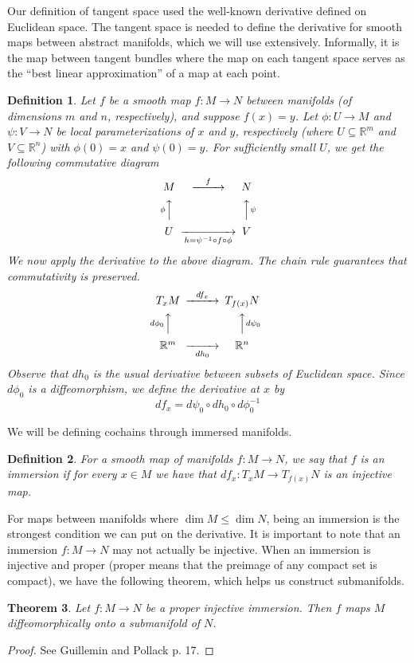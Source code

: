 \documentclass{amsart}          %
\newtheorem{theorem}{Theorem}[section]
\newtheorem{definition}[theorem]{Definition}
\newcommand{\R}{\mathbb R}
\begin{document}
Our definition of tangent space used the well-known derivative defined on Euclidean space.  The tangent space is needed to 
define the derivative for smooth maps between abstract manifolds, which we will use extensively.  Informally, it is the map between tangent
bundles where the map on each tangent space  serves as the ``best linear approximation'' of a map at each point.

\begin{definition}
Let $f$ be  a smooth map $f\colon M\rightarrow N$ between manifolds (of dimensions $m$ and $n$, 
respectively), and suppose $f(x) = y$.  
Let $\phi\colon U\rightarrow M$ and $\psi\colon V\rightarrow N$ be local parameterizations of $x$ and $y$, respectively (where $U\subseteq \R^m$ and $V\subseteq \R^n$) with $\phi(0)=x$ and $\psi(0)=y$. For sufficiently small $U$, we get the following commutative diagram
$$
\begin{CD}
M @>f>> N\\
@A\phi AA  @AA\psi A\\
U @>>h=\psi^{-1}\circ f\circ \phi> V
\end{CD}
$$
We now apply the derivative to the above diagram. The chain rule guarantees that commutativity is preserved.
$$
\begin{CD}
T_xM @>df_x>> T_{f(x)}N\\
@Ad\phi_0 AA  @AAd\psi_0 A\\
\R^m @>>dh_0> \R^n
\end{CD}
$$
Observe that $dh_0$ is the usual derivative between subsets of Euclidean space. Since $d\phi_0$ is a diffeomorphism, we define
the derivative at $x$ by 
\[df_x=d\psi_0\circ dh_0\circ d\phi_0^{-1}\]
\end{definition}

We will be defining cochains through immersed manifolds.

\begin{definition}
For a smooth map of manifolds $f\colon M\rightarrow N$, we say that $f$ is an \emph{immersion} if for every $x\in M$ we have that $df_x\colon T_xM\rightarrow T_{f(x)}N$ is an injective map.
\end{definition}
For maps between manifolds where $\dim M\leq \dim N$, being an immersion is the strongest condition we can put on the derivative. It is important to note that an immersion $f:M\to N$ may not actually be injective. When an immersion is injective and proper (proper means that the preimage of any compact set is compact), we have the following theorem, which helps us construct submanifolds.
\begin{theorem}
Let $f\colon M\rightarrow N$ be a proper injective immersion. Then $f$ maps $M$ diffeomorphically onto a submanifold of $N$.
\end{theorem}
\begin{proof}
	See Guillemin and Pollack p. 17.
\end{proof}	
\end{document}
